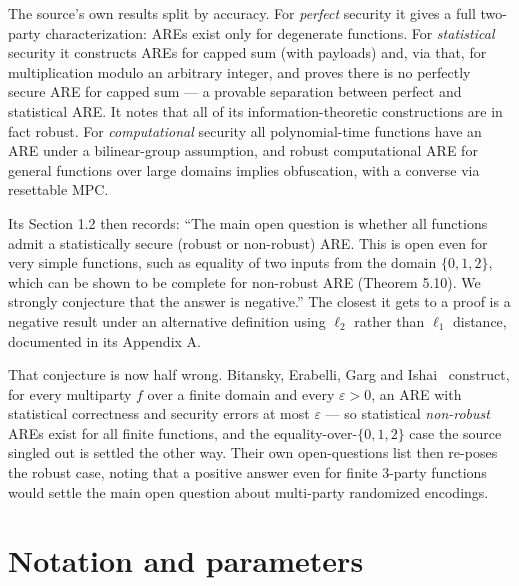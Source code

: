 \documentclass{aicr-conjecture}
\newcommand{\eps}{\varepsilon}
\begin{document}
The source's own results split by accuracy. For \emph{perfect} security
it gives a full two-party characterization: AREs exist only for
degenerate functions. For \emph{statistical} security it constructs AREs
for capped sum (with payloads) and, via that, for multiplication modulo
an arbitrary integer, and proves there is no perfectly secure ARE for
capped sum --- a provable separation between perfect and statistical ARE\@.
It notes that all of its information-theoretic constructions are in fact
robust. For \emph{computational} security all polynomial-time functions
have an ARE under a bilinear-group assumption, and robust computational
ARE for general functions over large domains implies obfuscation, with a
converse via resettable MPC\@.

Its Section 1.2 then records: ``The main open question is whether all
functions admit a statistically secure (robust or non-robust) ARE\@. This
is open even for very simple functions, such as equality of two inputs
from the domain $\{0,1,2\}$, which can be shown to be complete for
non-robust ARE (Theorem 5.10). We strongly conjecture that the answer is
negative.'' The closest it gets to a proof is a negative result under an
alternative definition using $\ell_{2}$ rather than $\ell_{1}$ distance,
documented in its Appendix A.

That conjecture is now half wrong. Bitansky, Erabelli, Garg and
Ishai~\cite{BEGI25} construct, for every multiparty $f$ over a finite
domain and every $\eps > 0$, an ARE with statistical correctness and
security errors at most $\eps$ --- so statistical \emph{non-robust} AREs
exist for all finite functions, and the equality-over-$\{0,1,2\}$ case
the source singled out is settled the other way. Their own open-questions
list then re-poses the robust case, noting that a positive answer even
for finite $3$-party functions would settle the main open question about
multi-party randomized encodings.

\section{Notation and parameters}\label{sec:notation}
\end{document}
